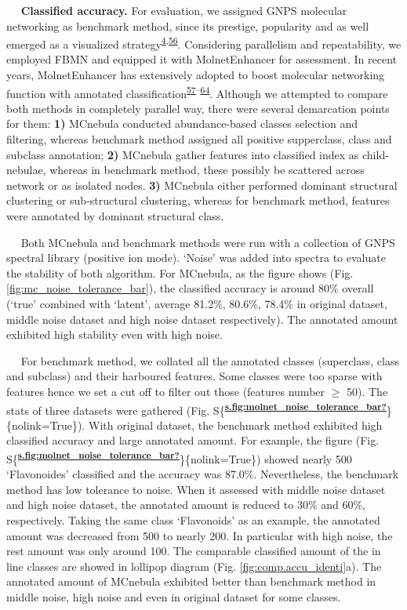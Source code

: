    \textbf{Classified accuracy.} For evaluation, we assigned GNPS
molecular networking as benchmark method, since its prestige, popularity
and as well emerged as a visualized
strategy\textsuperscript{\protect\hyperlink{ref-2016a}{4},\protect\hyperlink{ref-2020d}{56}}.
Considering parallelism and repeatability, we employed FBMN and equipped
it with MolnetEnhancer for assessment. In recent years, MolnetEnhancer
has extensively adopted to boost molecular networking function with
annotated
classification\textsuperscript{\protect\hyperlink{ref-2021cr}{57}--\protect\hyperlink{ref-2021cl}{64}}.
Although we attempted to compare both methods in completely parallel
way, there were several demarcation points for them: \textbf{1)}
MCnebula conducted abundance-based classes selection and filtering,
whereas benchmark method assigned all positive supperclass, class and
subclass annotation; \textbf{2)} MCnebula gather features into
classified index as child-nebulae, whereas in benchmark method, these
possibly be scattered across network or as isolated nodes. \textbf{3)}
MCnebula either performed dominant structural clustering or
sub-structural clustering, whereas for benchmark method, features were
annotated by dominant structural class.

   Both MCnebula and benchmark methods were run with a collection of
GNPS spectral library (positive ion mode). `Noise' was added into
spectra to evaluate the stability of both algorithm. For MCnebula, as
the figure shows (Fig.
{\protect\NoHyper\ref{fig:mc_noise_tolerance_bar}\protect\endNoHyper}),
the classified accuracy is around 80\% overall (`true' combined with
`latent', average 81.2\%, 80.6\%, 78.4\% in original dataset, middle
noise dataset and high noise dataset respectively). The annotated amount
exhibited high stability even with high noise.

   For benchmark method, we collated all the annotated classes
(superclass, class and subclass) and their harboured features. Some
classes were too sparse with features hence we set a cut off to filter
out those (features number \(\geq\) 50). The stats of three datasets
were gathered (Fig.
S\{\textsuperscript{\protect\hyperlink{ref-s.fig:molnet_noise_tolerance_bar}{\textbf{s.fig:molnet\_noise\_tolerance\_bar?}}}\}\{nolink=True\}).
With original dataset, the benchmark method exhibited high classified
accuracy and large annotated amount. For example, the figure (Fig.
S\{\textsuperscript{\protect\hyperlink{ref-s.fig:molnet_noise_tolerance_bar}{\textbf{s.fig:molnet\_noise\_tolerance\_bar?}}}\}\{nolink=True\})
showed nearly 500 `Flavonoides' classified and the accuracy was 87.0\%.
Nevertheless, the benchmark method has low tolerance to noise. When it
assessed with middle noise dataset and high noise dataset, the annotated
amount is reduced to 30\% and 60\%, respectively. Taking the same class
`Flavonoids' as an example, the annotated amount was decreased from 500
to nearly 200. In particular with high noise, the rest amount was only
around 100. The comparable classified amount of the in line classes are
showed in lollipop diagram (Fig.
{\protect\NoHyper\ref{fig:comp.accu_identi}\protect\endNoHyper}a). The
annotated amount of MCnebula exhibited better than benchmark method in
middle noise, high noise and even in original dataset for some classes.

